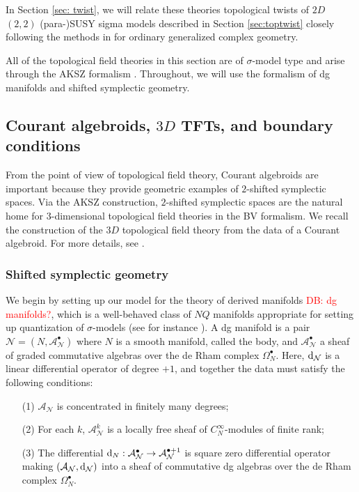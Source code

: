 \documentclass[letterpaper,12pt]{article}
\newcommand{\cN}{\mathcal{N}}
\newcommand{\sA}{\mathcal{A}}
\def\d{{\rm d}}
\theoremstyle{definition}
\theoremstyle{remark}
\theoremstyle{examples}
\def\brian{\textcolor{blue}{BM: }\textcolor{blue}}
\def\david{\textcolor{red}{DB: }\textcolor{red}}
\begin{document}
In Section \ref{sec: twist}, we will relate these theories topological twists of $2D$ $(2,2)$ (para-)SUSY sigma models described in Section \ref{sec:toptwist} closely following the methods in \cite{Kapustin:2004gv} for ordinary generalized complex geometry.

All of the topological field theories in this section are of $\sigma$-model type and arise through the AKSZ formalism \cite{AKSZ}. 
Throughout, we will use the formalism of dg manifolds and shifted symplectic geometry. 

\subsection{Courant algebroids, $3D$ TFTs, and boundary conditions}


From the point of view of topological field theory, Courant algebroids are important because they provide geometric examples of $2$-shifted symplectic spaces. 
Via the AKSZ construction, $2$-shifted symplectic spaces are the natural home for $3$-dimensional topological field theories in the BV formalism. 
We recall the construction of the $3D$ topological field theory from the data of a Courant algebroid. 
For more details, see \cite{Roytenberg:2002nu, Cattaneo:2009zx}. 

\subsubsection{Shifted symplectic geometry} 
\label{sec: dgman}

We begin by setting up our model for the theory of derived manifolds \david{dg manifolds?}, which is a well-behaved class of $NQ$ manifolds appropriate for setting up quantization of $\sigma$-models (see for instance \cite{CostelloSUSY}). 
A dg manifold is a pair $\cN = (N, \sA^\bullet_\cN)$ where $N$ is a smooth manifold, called the body, and $\sA^\bullet_\cN$ a sheaf of graded commutative algebras over the de Rham complex $\Omega^\bullet_N$.
Here, $\d_\cN$ is a linear differential operator of degree $+1$, and together the data must satisfy the following conditions:
\begin{itemize}
\item[(1)] $\sA_\cN$ is concentrated in finitely many degrees;
\item[(2)] For each $k$, $\sA^k_\cN$ is a locally free sheaf of $C^\infty_N$-modules of finite rank;
\item[(3)] The differential $\d_N : \sA_\cN^\bullet \to \sA_\cN^{\bullet+1}$ is square zero differential operator making $(\sA_\cN , \d_\cN)$ into a sheaf of commutative dg algebras over the de Rham complex $\Omega^\bullet_N$.
\end{itemize}
\end{document}
